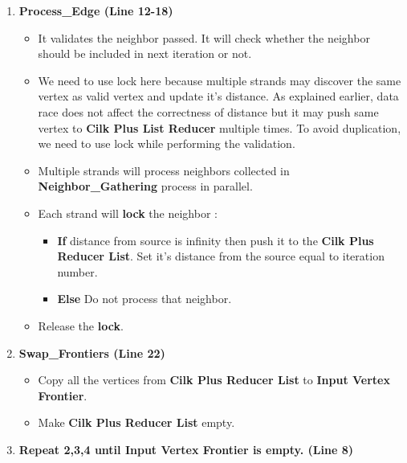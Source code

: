 \documentclass{article}
\begin{document}
\begin{enumerate}
\item \textbf{Process\_Edge (Line 12-18)}
\begin{itemize}
\item It validates the neighbor passed. It will check whether the neighbor should be included in next iteration or not.\\
\item We need to use lock here because multiple strands may discover the same vertex as valid vertex and update it's distance. As explained earlier, data race does not affect the correctness of distance but it may push same vertex to \textbf{Cilk Plus List Reducer} multiple times. To avoid duplication, we need to use lock while performing the validation. \\
\item Multiple strands will process neighbors collected in \textbf{Neighbor\_Gathering} process in parallel. \\
\item Each strand will \textbf{lock} the neighbor : \\
\begin{itemize}
\item \textbf{If} distance from source is infinity then push it to the \textbf{Cilk Plus Reducer List}. Set it's distance from the source equal to iteration number. \\
\item \textbf{Else} Do not process that neighbor.  \\
\end{itemize}
\item Release the \textbf{lock}.\\
\end{itemize}

\item \textbf{Swap\_Frontiers (Line 22)} \\
\begin{itemize}
\item Copy all the vertices from \textbf{Cilk Plus Reducer List} to \textbf{Input Vertex Frontier}.\\
\item Make \textbf{Cilk Plus Reducer List} empty. \\
\end{itemize}

\item \textbf{Repeat 2,3,4 until \textbf{Input Vertex Frontier} is empty. (Line 8)} \\

\end{enumerate}
\end{document}

